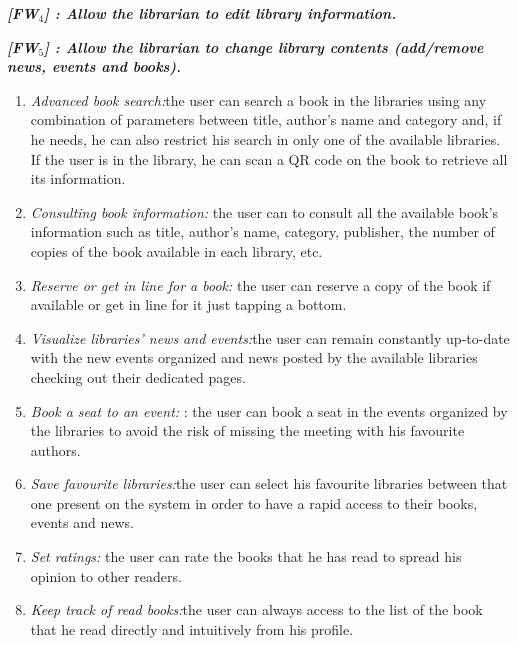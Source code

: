 \vspace{0.5cm}
\noindent
\emph{\textbf{[FW$_{4}$] : Allow the librarian to edit library information.}}

\vspace{0.5cm}
\noindent
\emph{\textbf{[FW$_{5}$] : Allow the librarian to change library contents (add/remove news, events and books).}}






\begin{enumerate}
\item \emph{Advanced book search:}the user can search a book in the libraries using any combination of parameters between title, author’s name and category and, if he needs, he can also restrict his search in only one of the available libraries. If the user is in the library, he can scan a QR code on the book to retrieve all its information.
\item \emph{Consulting book information:} the user can to consult all the available book’s information such as title, author’s name, category, publisher, the number of copies of the book available in each library, etc.
\item \emph{Reserve or get in line for a book:} the user can reserve a copy of the book if available or get in line for it just tapping a bottom.
\item \emph{Visualize libraries’ news and events:}the user can remain constantly up-to-date with the new events organized and news posted by the available libraries checking out their dedicated pages. 
\item \emph{Book a seat to an event:} : the user can book a seat in the events organized by the libraries to avoid the risk of missing the meeting with his favourite authors.
\item \emph{Save favourite libraries:}the user can select his favourite libraries between that one present on the system in order to have a rapid access to their books, events and news. 
\item \emph{Set ratings:} the user can rate the books that he has read to spread his opinion to other readers.
\item \emph{Keep track of read books:}the user can always access to the list of the book that he read directly and intuitively from his profile.
\end{enumerate}
